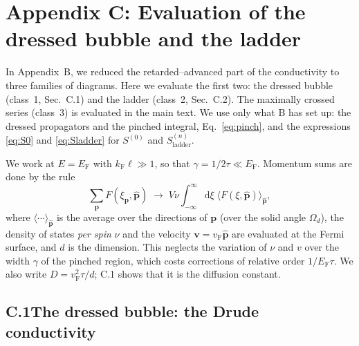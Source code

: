 \newcommand{\cframe}[1]{%
  \draw[thickline] (0,0)--(#1,0); \draw[thickadv] (0,-1.4)--(#1,-1.4);
  \draw[gray] (0,0)--(0,-1.4); \draw[gray] (#1,0)--(#1,-1.4);
  \node[vert] at (0,-0.7) {}; \node[vert] at (#1,-0.7) {};}
\newcommand{\crung}[1]{%
  \node[dot] at (#1,0) {}; \node[dot] at (#1,-1.4) {};
  \draw[imp] (#1,0)--(#1,-1.4);}

\newpage
\section*{Appendix C: Evaluation of the dressed bubble and the ladder}
\label{app:evaluation}

\noindent
In Appendix~B, we reduced the retarded--advanced part of the conductivity to three families of diagrams. Here we evaluate the first two: the dressed bubble (class~1, Sec.~C.1) and the ladder (class~2, Sec.~C.2). The maximally crossed series (class~3) is evaluated in the main text. We use only what B has set up: the dressed propagators and the pinched integral, Eq.~\eqref{eq:pinch}, and the expressions \eqref{eq:S0} and \eqref{eq:Sladder} for $S^{(0)}$ and $S^{(n)}_{\mathrm{ladder}}$.

We work at $E=E_{\mathrm F}$ with $k_{\mathrm F}\ell\gg1$, so that
$\gamma=1/2\tau\ll E_{\mathrm F}$. Momentum sums are done by the
rule
\[
\sum_{\mathbf p}F(\xi_{\mathbf p},\hat{\mathbf p})
\;\to\;
V\nu\int_{-\infty}^{\infty}\mathrm{d}\xi\;
\big\langle F(\xi,\hat{\mathbf p})\big\rangle_{\hat{\mathbf p}},
\]
where $\langle\cdots\rangle_{\hat{\mathbf p}}$ is the average over
the directions of $\mathbf p$ (over the solid angle $\Omega_d$),
the density of states \emph{per spin} $\nu$ and the velocity
$\mathbf v=v_{\mathrm F}\hat{\mathbf p}$ are evaluated at the Fermi
surface, and $d$ is the dimension. This neglects the variation of $\nu$ and $v$ over the
width $\gamma$ of the pinched region, which costs corrections of
relative order $1/E_{\mathrm F}\tau$. We also write
$D=v_{\mathrm F}^2\tau/d$; C.1 shows that it is the diffusion constant.

\subsection*{C.1\quad The dressed bubble: the Drude conductivity}

